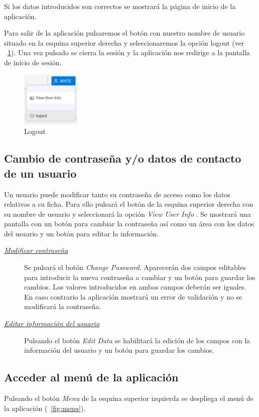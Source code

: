Si los datos introducidos son correctos se mostrará la página de inicio de la aplicación.

Para salir de la aplicación pulsaremos el botón con nuestro nombre de usuario situado en la esquina superior derecha y seleccionaremos la opción logout (ver \figurename~\ref{fig:logout}). Una vez pulsado se cierra la sesión y la aplicación nos redirige a la pantalla de inicio de sesión.

\begin{figure}[H]
  \centering
  \includegraphics[width=0.25\textwidth]{imaxes/logout.png}
  \caption{Logout}
  \label{fig:logout}
\end{figure}


\subsection{Cambio de contraseña y/o datos de contacto de un usuario}
\label{sub:contraseña}
Un usuario puede modificar tanto su contraseña de acceso como los datos relativos a su ficha. Para ello pulsará el botón de la esquina superior derecha con su nombre de usuario y seleccionará la opción \textit{View User Info} .
Se mostrará una pantalla con un botón para cambiar la contraseña así como un área con los datos del usuario y un botón para editar la información.

\begin{description}
\item[\underline{\textsl{Modificar contraseña}}] Se pulsará el botón \emph{Change Password}. Aparecerán dos campos editables para introducir la nueva contraseña a cambiar y un botón para guardar los cambios. Los valores introducidos en ambos campos deberán ser iguales. En caso contrario la aplicación mostrará un error de validación y no se modificará la contraseña.

\item[\underline{\textsl{Editar información del usuario}}] Pulsando el botón \emph{Edit Data} se habilitará la edición de los campos con la información del usuario y un botón para guardar los cambios.
\end{description}


\subsection{Acceder al menú de la aplicación}
\label{sub:menu}
Pulsando el botón \emph{Menu} de la esquina superior izquierda se despliega el menú de la aplicación (\figurename~\ref{fig:menu}).

